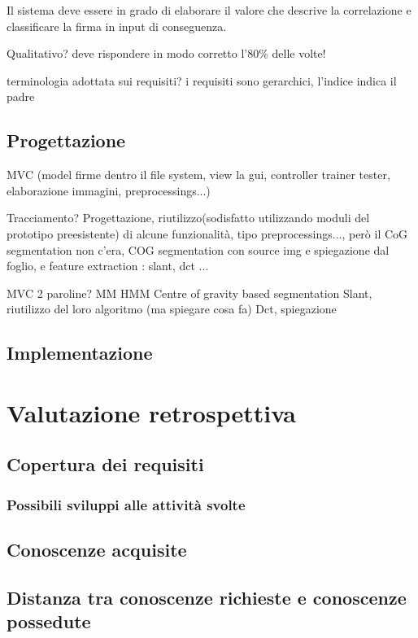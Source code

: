 Il sistema deve essere in grado di elaborare il valore che descrive la correlazione e classificare la firma in input di conseguenza.

Qualitativo? deve rispondere in modo corretto l'80\% delle volte!

terminologia adottata sui requisiti?
i requisiti sono gerarchici, l'indice indica il padre 
\subsection{Progettazione}
\label{3.3}
MVC (model firme dentro il file system, view la gui, controller trainer tester, elaborazione immagini, preprocessings...)


Tracciamento? Progettazione, riutilizzo(sodisfatto utilizzando moduli del prototipo preesistente) di alcune funzionalità, tipo preprocessings..., però il CoG segmentation non c'era, COG segmentation con source img e spiegazione dal foglio, e feature extraction : slant, dct ...


MVC 2 paroline?
MM
HMM
Centre of gravity based segmentation
Slant, riutilizzo del loro algoritmo (ma spiegare cosa fa)
Dct, spiegazione

\subsection{Implementazione}
\label{3.4}
\newpage

\section{Valutazione retrospettiva}
\label{4.0}

\subsection{Copertura dei requisiti}
\label{4.1}

\subsubsection{Possibili sviluppi alle attività svolte}
\subsection{Conoscenze acquisite}

\label{4.2}
\subsection{Distanza tra conoscenze richieste e conoscenze possedute}

